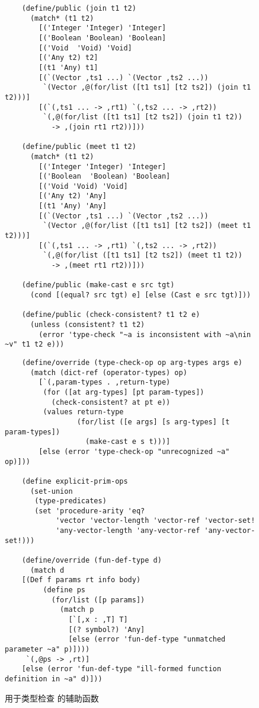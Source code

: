 \documentclass[11pt]{book}
\begin{document}
\begin{figure}[tbp]
\begin{lstlisting}
    (define/public (join t1 t2)
      (match* (t1 t2)
        [('Integer 'Integer) 'Integer]
        [('Boolean 'Boolean) 'Boolean]
        [('Void  'Void) 'Void]
        [('Any t2) t2]
        [(t1 'Any) t1]
        [(`(Vector ,ts1 ...) `(Vector ,ts2 ...))
         `(Vector ,@(for/list ([t1 ts1] [t2 ts2]) (join t1 t2)))]
        [(`(,ts1 ... -> ,rt1) `(,ts2 ... -> ,rt2))
         `(,@(for/list ([t1 ts1] [t2 ts2]) (join t1 t2))
           -> ,(join rt1 rt2))]))

    (define/public (meet t1 t2)
      (match* (t1 t2)
        [('Integer 'Integer) 'Integer]
        [('Boolean  'Boolean) 'Boolean]
        [('Void 'Void) 'Void]
        [('Any t2) 'Any]
        [(t1 'Any) 'Any]
        [(`(Vector ,ts1 ...) `(Vector ,ts2 ...))
         `(Vector ,@(for/list ([t1 ts1] [t2 ts2]) (meet t1 t2)))]
        [(`(,ts1 ... -> ,rt1) `(,ts2 ... -> ,rt2))
         `(,@(for/list ([t1 ts1] [t2 ts2]) (meet t1 t2))
           -> ,(meet rt1 rt2))]))

    (define/public (make-cast e src tgt)
      (cond [(equal? src tgt) e] [else (Cast e src tgt)]))

    (define/public (check-consistent? t1 t2 e)
      (unless (consistent? t1 t2)
        (error 'type-check "~a is inconsistent with ~a\nin ~v" t1 t2 e)))
\end{lstlisting}
\end{figure}
\begin{figure}[tbp]
\begin{lstlisting}
    (define/override (type-check-op op arg-types args e)
      (match (dict-ref (operator-types) op)
        [`(,param-types . ,return-type)
         (for ([at arg-types] [pt param-types]) 
           (check-consistent? at pt e))
         (values return-type
                 (for/list ([e args] [s arg-types] [t param-types])
                   (make-cast e s t)))]
        [else (error 'type-check-op "unrecognized ~a" op)]))

    (define explicit-prim-ops
      (set-union
       (type-predicates)
       (set 'procedure-arity 'eq?
            'vector 'vector-length 'vector-ref 'vector-set!
            'any-vector-length 'any-vector-ref 'any-vector-set!)))

    (define/override (fun-def-type d)
      (match d
	[(Def f params rt info body)
         (define ps
           (for/list ([p params])
             (match p
               [`[,x : ,T] T]
               [(? symbol?) 'Any]
               [else (error 'fun-def-type "unmatched parameter ~a" p)])))
	 `(,@ps -> ,rt)]
	[else (error 'fun-def-type "ill-formed function definition in ~a" d)]))
\end{lstlisting}
\caption{用于类型检查 \LangGrad{} 的辅助函数}
\label{fig:type-check-Rgradual-aux}
\end{figure}
\end{document}
